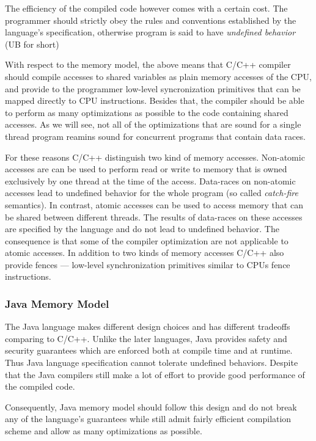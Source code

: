 \documentclass[a4paper,twoside,11pt]{article}
\numberwithin{equation}{section}
\begin{document}
The efficiency of the compiled code however comes with a certain cost.
The programmer should strictly obey the rules and conventions
established by the language's specification, 
otherwise program is said to have \emph{undefined behavior} (UB for short)

With respect to the memory model, the above means that C/C++ compiler should
compile accesses to shared variables as plain memory accesses of the CPU,
and provide to the programmer low-level syncronization primitives
that can be mapped directly to CPU instructions.
Besides that, the compiler should be able to perform 
as many optimizations as possible to the code containing shared accesses.
As we will see, not all of the optimizations that are sound 
for a single thread program reamins sound for concurrent programs that contain data races. 

For these reasons C/C++ distinguish two kind of memory accesses.
Non-atomic accesses are can be used to perform read or write to memory that 
is owned exclusively by one thread at the time of the access.
Data-races on non-atomic accesses lead to undefined behavior for the whole program
(so called \emph{catch-fire} semantics).
In contrast, atomic accesses can be used to access memory that can be shared between different threads. 
The results of data-races on these accesses are specified by the language and do not lead to undefined behavior.
The consequence is that some of the compiler optimization are not applicable to atomic accesses.
In addition to two kinds of memory accesses C/C++ also provide fences ---
low-level synchronization primitives similar to CPUs fence instructions.

\subsubsection{Java Memory Model}

The Java language makes different design choices and has different tradeoffs comparing to C/C++.
Unlike the later languages, Java provides safety and security guarantees
which are enforced both at compile time and at runtime.  
Thus Java language specification cannot tolerate undefined behaviors.
Despite that the Java compilers still make a lot of effort 
to provide good performance of the compiled code.

Consequently, Java memory model should follow this design 
and do not break any of the language's guarantees
while still admit fairly efficient compilation scheme
and allow as many optimizations as possible.
\end{document}
